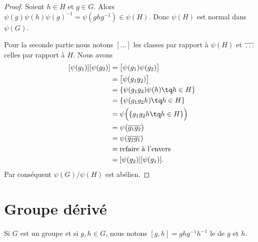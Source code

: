\begin{proof}
	Soient \( h\in H\) et \( g\in G\). Alors \( \psi(g)\psi(h)\psi(g)^{-1}=\psi(ghg^{-1})\in\psi(H)\). Donc \( \psi(H)\) est normal dans \( \psi(G)\).

	Pour la seconde partie nous notons \( [\ldots]\) les classes par rapport à \( \psi(H)\) et \( \overline{ \vphantom{g}\ldots }\) celles par rapport à \( H\). Nous avons
	\begin{subequations}
		\begin{align}
			[\psi(g_1)][\psi(g_2)] & =\big[ \psi(g_1)\psi(g_2) \big]            \\
			                       & =\big[ \psi(g_1g_2) \big]                  \\
			                       & =\{ \psi(g_1g_2)\psi(h)\tq h\in H \}       \\
			                       & =\{ \psi(g_1g_2h)\tq h\in H \}             \\
			                       & =\psi\Big(  \{ g_1g_2h\tq h\in H \}  \Big) \\
			                       & =\psi\big( \overline{ g_1g_2 } \big)       \\
			                       & =\psi(\overline{ g_2g_1 })                 \\
			                       & =\text{refaire à l'envers}                 \\
			                       & =[\psi(g_2)][\psi(g_1)].
		\end{align}
	\end{subequations}
	Par conséquent \( \psi(G)/\psi(H)\) est abélien.
\end{proof}

\section{Groupe dérivé}

\begin{definition}      \label{DEFooVHZAooUgmesE}
	Si \( G\) est un groupe et si \( g,h\in G\), nous notons \( [g,h]=ghg^{-1}h^{-1}\) le  de \( g\) et \( h\).
\end{definition}

